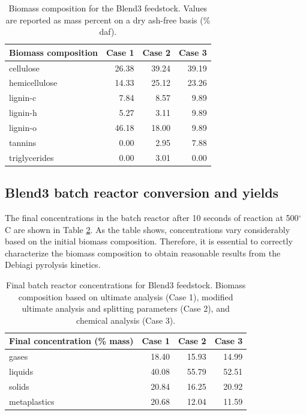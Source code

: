 \begin{table}[H]
    \centering
    \caption{Biomass composition for the Blend3 feedstock. Values are reported as mass percent on a dry ash-free basis (\% daf).}
    \label{tab:blend3-biocomp}
    \begin{tabular}{lrrr}
        \toprule
        Biomass composition & Case 1 & Case 2 & Case 3 \\
        \midrule
        cellulose     & 26.38 & 39.24 & 39.19 \\
        hemicellulose & 14.33 & 25.12 & 23.26 \\
        lignin-c      & 7.84  & 8.57  & 9.89  \\
        lignin-h      & 5.27  & 3.11  & 9.89  \\
        lignin-o      & 46.18 & 18.00 & 9.89  \\
        tannins       & 0.00  & 2.95  & 7.88  \\
        triglycerides & 0.00  & 3.01  & 0.00  \\
        \bottomrule
    \end{tabular}
\end{table}

\subsection{Blend3 batch reactor conversion and yields}

The final concentrations in the batch reactor after 10 seconds of reaction at 500$^{\circ}$C are shown in Table \ref{tab:blend3-batch-final}. As the table shows, concentrations vary considerably based on the initial biomass composition. Therefore, it is essential to correctly characterize the biomass composition to obtain reasonable results from the Debiagi pyrolysis kinetics.

\begin{table}[H]
    \centering
    \caption{Final batch reactor concentrations for Blend3 feedstock. Biomass composition based on ultimate analysis (Case 1), modified ultimate analysis and splitting parameters (Case 2), and chemical analysis (Case 3).}
    \label{tab:blend3-batch-final}
    \begin{tabular}{lrrr}
        \toprule
        Final concentration (\% mass) & Case 1 & Case 2 & Case 3 \\
        \midrule
        gases         & 18.40 & 15.93 & 14.99 \\
        liquids       & 40.08 & 55.79 & 52.51 \\
        solids        & 20.84 & 16.25 & 20.92 \\
        metaplastics  & 20.68 & 12.04 & 11.59 \\
        \bottomrule
    \end{tabular}
\end{table}

